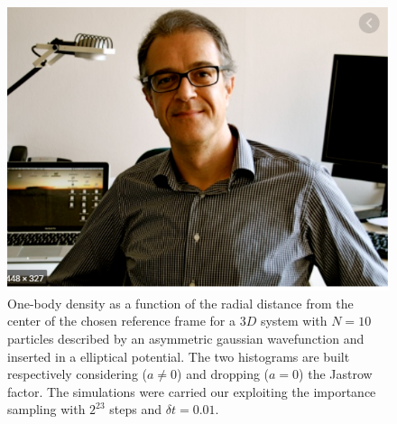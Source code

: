 \begin{figure}[H]
    \includegraphics[scale=0.5]{images/yaaaa.png}
    \caption{One-body density as a function of the radial distance from the center of the chosen reference frame for a $3D$ system with $N=10$ particles described by an asymmetric gaussian wavefunction and inserted in a elliptical potential. The two histograms are built respectively considering ($a\neq0$) and dropping ($a=0$) the Jastrow factor. The simulations were carried our exploiting the importance sampling with $2^{23}$ steps and $\delta t =0.01$.}
    \label{fig:one_body_density_histogram}
\end{figure}